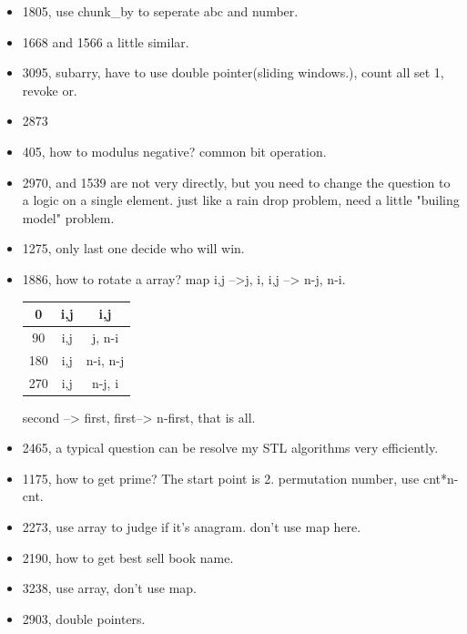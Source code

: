 \documentclass[a4paper,11pt,twoside]{book}
\begin{document}
\begin{itemize}
	\item 1805, use chunk\_by to seperate abc and number. 
	
	\item 1668 and 1566 a little similar.
	
	\item 3095,  subarry, have to use double pointer(sliding windows.), count all set 1, revoke or. 
	
	\item 2873 
	
	\item 405, how to modulus negative? common bit operation. 
	
	
	\item 2970, and 1539 are not very directly, but you need to change the question to a logic on a single element. just like a rain drop problem, need a little "builing model" problem. 
	
	\item 1275, only last one decide who will win. 
	
	\item 1886, how to rotate a array?  map i,j -->j, i,  i,j --> n-j, n-i. 
	
	\begin{tabular}{|c|c|c|}
		\hline
		0 & i,j  & i,j  \\
		\hline
		90 &i,j & j, n-i \\
		\hline
		180	& i,j& n-i, n-j \\
		\hline
		270	& i,j& n-j, i \\
		\hline
	\end{tabular}

	second --> first,  first--> n-first, that is all. 
	
	\item 2465, a typical question can be resolve my STL algorithms very efficiently. 
	
	\item 1175, how to get prime? The start point is 2. permutation number, use cnt*n-cnt. 
	
	\item 2273, use array to judge if it's anagram. don't use map here. 
	
	\item 2190, how to get best sell book name. 
	
	\item 3238, use array, don't use map. 
	
	\item 2903, double pointers. 
	

\end{itemize}
\end{document}
